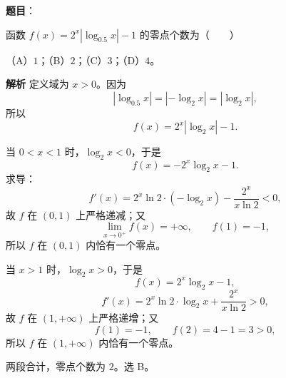 \begin{answer}

\textbf{题目}：

函数 $f(x)=2^x|\log_{0.5}x|-1$ 的零点个数为\mbox{（　　）}

（A）$1$；（B）$2$；（C）$3$；（D）$4$。

\textbf{解析}
定义域为 $x>0$。因为
\nopagebreak[4]
\[|\log_{0.5}x|=|-\log_2x|=|\log_2x|,\]
所以
\nopagebreak[4]
\[f(x)=2^x|\log_2x|-1.\]

当 $0<x<1$ 时，$\log_2x<0$，于是
\nopagebreak[4]
\[f(x)=-2^x\log_2x-1.\]
求导：
\nopagebreak[4]
\[f'(x)=2^x\ln2\cdot(-\log_2x)-\frac{2^x}{x\ln2}<0,\]
故 $f$ 在 $(0,1)$ 上严格递减；又
\nopagebreak[4]
\[\lim_{x\to0^+}f(x)=+\infty,\qquad f(1)=-1,\]
所以 $f$ 在 $(0,1)$ 内恰有一个零点。

当 $x>1$ 时，$\log_2x>0$，于是
\nopagebreak[4]
\[f(x)=2^x\log_2x-1,\]
\nopagebreak[4]
\[f'(x)=2^x\ln2\cdot\log_2x+\frac{2^x}{x\ln2}>0,\]
故 $f$ 在 $(1,+\infty)$ 上严格递增；又
\nopagebreak[4]
\[f(1)=-1,\qquad f(2)=4-1=3>0,\]
所以 $f$ 在 $(1,+\infty)$ 内恰有一个零点。

两段合计，零点个数为 $2$。选 B。


\end{answer}

